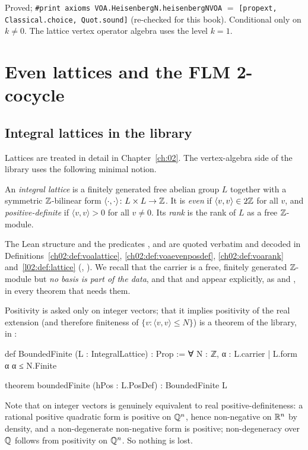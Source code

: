 \begin{status}
Proved; \texttt{\#print axioms VOA.HeisenbergN.heisenbergNVOA} $=$
\texttt{[propext, Classical.choice, Quot.sound]} (re-checked for this book). Conditional only on
$k\neq 0$. The lattice vertex operator algebra uses the level $k=1$.
\end{status}

\section{Even lattices and the FLM 2-cocycle}\label{ch03:sec:cocycle}

\subsection{Integral lattices in the library}

Lattices are treated in detail in Chapter~\ref{ch:02}. The vertex-algebra side of the library uses
the following minimal notion.

\begin{definition}\label{ch03:def:lattice}
An \emph{integral lattice} is a finitely generated free abelian group $L$ together with a
symmetric ${\mathbb{Z}}$-bilinear form $\langle\cdot,\cdot\rangle\colon L\times L\to{\mathbb{Z}}$. It is \emph{even}
if $\langle v,v\rangle\in2{\mathbb{Z}}$ for all $v$, and \emph{positive-definite} if
$\langle v,v\rangle>0$ for all $v\ne0$. Its \emph{rank} is the rank of $L$ as a free
${\mathbb{Z}}$-module.
\end{definition}

The Lean structure  and the predicates ,  and
 are quoted verbatim and decoded in Definitions~\ref{ch02:def:voalattice},
\ref{ch02:def:voaevenposdef}, \ref{ch02:def:voarank} and~\ref{l02:def:lattice}
(, ). We
recall that the carrier is a free, finitely generated ${\mathbb{Z}}$-module but \emph{no basis is part of the
data}, and that  and  appear explicitly, as  and ,
in every theorem that needs them.

\begin{dictionary}
Positivity is asked only on integer vectors; that it implies positivity of the real extension
(and therefore finiteness of $\{v:\langle v,v\rangle\le N\}$) is a theorem of the library,
 in :
\begin{leancode}
def BoundedFinite (L : IntegralLattice) : Prop :=
  ∀ N : ℤ, {α : L.carrier | L.form α α ≤ N}.Finite

theorem boundedFinite (hPos : L.PosDef) : BoundedFinite L
\end{leancode}
Note that  on integer vectors is genuinely equivalent to real positive-definiteness:
a rational positive quadratic form is positive on ${\mathbb{Q}}^n$, hence non-negative on $\mathbb{R}^n$ by
density, and a non-degenerate non-negative form is positive; non-degeneracy over ${\mathbb{Q}}$ follows from
positivity on ${\mathbb{Q}}^n$. So nothing is lost.
\end{dictionary}

